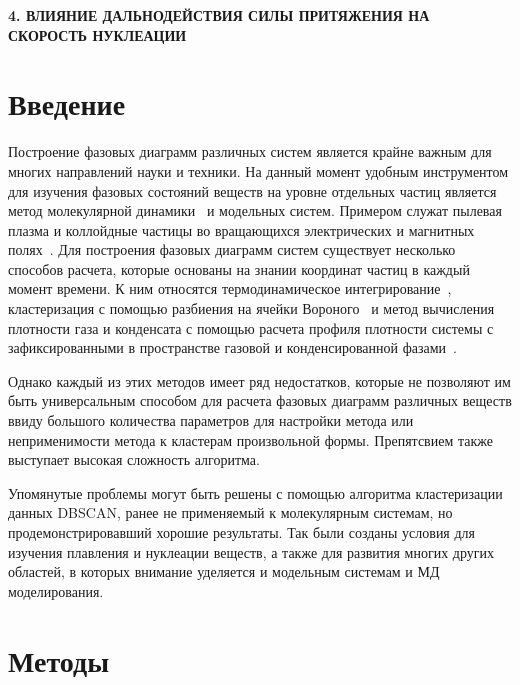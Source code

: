 
\begin{center}
\textbf{\large 4. ВЛИЯНИЕ ДАЛЬНОДЕЙСТВИЯ СИЛЫ ПРИТЯЖЕНИЯ НА СКОРОСТЬ НУКЛЕАЦИИ}
\end{center}

\section{Введение}
\label{PRIMe-SecIntroduction}

Построение фазовых диаграмм различных систем является крайне важным для многих направлений науки и техники.
На данный момент удобным инструментом для изучения фазовых состояний веществ на уровне отдельных частиц является метод молекулярной динамики~\cite{10.1063/1.1730376, 10.1006/jcph.1995.1039} и модельных систем.
Примером служат пылевая плазма и коллойдные частицы во вращающихся электрических и магнитных полях~\cite{10.1038/s41598-017-14001-y, 10.1103/physreve.103.022608, 10.1103/physreve.96.043201}.
Для построения фазовых диаграмм систем существует несколько способов расчета, которые основаны на знании координат частиц в каждый момент времени.
К ним относятся термодинамическое интегрирование~\cite{10.1088/0953-8984/21/46/465104}, кластеризация с помощью разбиения на ячейки Вороного~\cite{10.1021/acs.jpcc.7b09317} и метод вычисления плотности газа и конденсата с помощью расчета профиля плотности системы с зафиксированными в пространстве газовой и конденсированной фазами~\cite{10.1021/jp806127j, 10.1021/jp1117213}.

Однако каждый из этих методов имеет ряд недостатков, которые не позволяют им быть универсальным способом для расчета фазовых диаграмм различных веществ ввиду большого количества параметров для настройки метода или неприменимости метода к кластерам произвольной формы.
Препятсвием также выступает высокая сложность алгоритма.

Упомянутые проблемы могут быть решены с помощью алгоритма кластеризации данных DBSCAN, ранее не применяемый к молекулярным системам, но продемонстрировавший хорошие результаты.
Так были созданы условия для изучения плавления и нуклеации веществ, а также для развития многих других областей, в которых внимание уделяется и модельным системам и МД моделирования.


\section{Методы}
\label{PRIMe-SecMethods}

